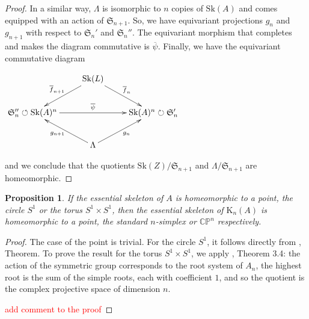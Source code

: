 \documentclass{amsart}%
\numberwithin{equation}{subsection}
\theoremstyle{plain2}
\newtheorem{prop}[equation]{Proposition}
\theoremstyle{definition2}
\theoremstyle{stepstyle}
\theoremstyle{point}
\theoremstyle{subpoint}
\newcommand{\CP}{\ensuremath{\mathbb{CP}}}
\newcommand{\Sk}{\mathrm{Sk}}
\begin{document}
\begin{proof}
In a similar way, $\Lambda$ is isomorphic to $n$ copies of $\Sk(A)$ and comes equipped with an action of $\mathfrak{S}_{n+1}$. So, we have equivariant projections $g_n$ and $g_{n+1}$ with respect to $\mathfrak{S}_n'$ and $\mathfrak{S}_n''$. The equivariant morphism that completes and makes the diagram commutative is $\overline{\psi}$. Finally, we have the equivariant commutative diagram
\begin{center}
\xymatrixrowsep{1pc}
\xymatrixrowsep{1pc}
$\xymatrix{
& \Sk(L)  \ar[ld]_{\overline{f}_{n+1}} \ar[rd]^{\overline{f}_{n}}  &\\
\mathfrak{S}_n'' \circlearrowleft\Sk(A)^n  \ar[rr]^{\overline{\psi}}& & \Sk(A)^n\circlearrowright \mathfrak{S}_n' \\
& \Lambda\ar[lu]^{g_{n+1}}\ar[ru]_{g_n} &
}$
\end{center} and we conclude that the quotients $\Sk(Z)/\mathfrak{S}_{n+1}$ and $\Lambda/\mathfrak{S}_{n+1}$ are homeomorphic.
\end{proof}

\begin{prop} \label{prop top essential skeleton Kummer}
If the essential skeleton of $A$ is homeomorphic to a point, the circle $S^1$ or the torus $S^1 \times S^1$, then the essential skeleton of $\text{K}_n(A)$ is homeomorphic to a point, the standard $n$-simplex or $\CP^n$ respectively. 
\end{prop}
\begin{proof}
The case of the point is trivial. For the circle $S^1$, it follows directly from \cite{Morton}, Theorem. To prove the result for the torus $S^1 \times S^1$, we apply \cite{Looijenga}, Theorem 3.4: the action of the symmetric group corresponds to the root system of $A_n$, the highest root is the sum of the simple roots, each with coefficient $1$, and so the quotient is the complex projective space of dimension $n$.

\textcolor{red}{add comment to the proof}
\end{proof}
\end{document}
